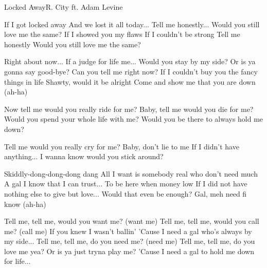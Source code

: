 \documentclass[a4paper,11pt,french]{article}
\begin{document}
\begin{Song}{Locked Away}{R. City ft. Adam Levine}
\begin{multicols}{2}

\begin{Chorus}
If I got locked away
And we lost it all today...
Tell me honestly...
Would you still love me the same?
If I showed you my flaws
If I couldn't be strong
Tell me honestly
Would you still love me the same?
\end{Chorus}
\espaceInterStrophe

\begin{Verse}
Right about now...
If a judge for life me...
Would you stay by my side?
Or is ya gonna say good-bye?
Can you tell me right now?
If I couldn't buy you the fancy things in life
Shawty, would it be alright
Come and show me that you are down (ah-ha)
\end{Verse}
\espaceInterStrophe

\begin{PreChorus}
Now tell me would you really ride for me?
Baby, tell me would you die for me?
Would you spend your whole life with me?
Would you be there to always hold me down?

Tell me would you really cry for me?
Baby, don't lie to me
If I didn't have anything... 
I wanna know would you stick around?
\end{PreChorus}
\espaceInterStrophe

\tochorus
\espaceInterStrophe

\begin{Verse}
Skiddly-dong-dong-dong dang
All I want is somebody real who don't need much
A gal I know that I can trust...
To be here when money low
If I did not have nothing else to give but love...
Would that even be enough?
Gal, meh need fi know (ah-ha)
\end{Verse}
\espaceInterStrophe

\espaceInterStrophe

\tochorus
\espaceInterStrophe

\begin{Bridge}
Tell me, tell me, would you want me? (want me)
Tell me, tell me, would you call me? (call me)
If you knew I wasn't ballin'
'Cause I need a gal who's always by my side...
Tell me, tell me, do you need me? (need me)
Tell me, tell me, do you love me yea?
Or is ya just tryna play me?
'Cause I need a gal to hold me down for life...
\end{Bridge}
\espaceInterStrophe


\end{multicols}
\end{Song}
\end{document}

